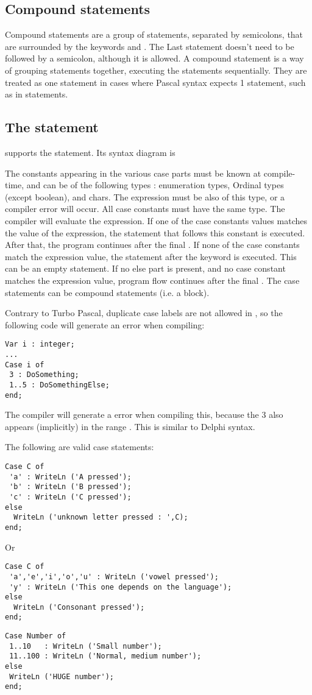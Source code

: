 \subsection{Compound statements}
Compound statements are a group of statements, separated by semicolons,
that are surrounded by the keywords  and . The
Last statement doesn't need to be followed by a semicolon, although it is
allowed. A compound statement is a way of grouping statements together,
executing the statements sequentially. They are treated as one statement
in cases where Pascal syntax expects 1 statement, such as in
 statements.

\subsection{The  statement}
\fpc supports the  statement. Its syntax diagram is

The constants appearing in the various case parts must be known at
compile-time, and can be of the following types : enumeration types,
Ordinal types (except boolean), and chars. The expression must be also of
this type, or a compiler error will occur. All case constants must
have the same type.
The compiler will evaluate the expression. If one of the case constants
values matches the value of the expression, the statement that follows
this constant is executed. After that, the program continues after the final
.
If none of the case constants match the expression value, the statement
after the  keyword is executed. This can be an empty statement.
If no else part is present, and no case constant matches the expression
value, program flow continues after the final .
The case statements can be compound statements
(i.e. a  block).

\begin{remark}
Contrary to Turbo Pascal, duplicate case labels are not
allowed in \fpc, so the following code will generate an error when
compiling:
\begin{verbatim}
Var i : integer;
...
Case i of
 3 : DoSomething;
 1..5 : DoSomethingElse;
end;
\end{verbatim}
The compiler will generate a  error when compiling
this, because the 3 also appears (implicitly) in the range . This
is similar to Delphi syntax.
\end{remark}
The following are valid case statements:
\begin{verbatim}
Case C of
 'a' : WriteLn ('A pressed');
 'b' : WriteLn ('B pressed');
 'c' : WriteLn ('C pressed');
else
  WriteLn ('unknown letter pressed : ',C);
end;
\end{verbatim}
Or
\begin{verbatim}
Case C of
 'a','e','i','o','u' : WriteLn ('vowel pressed');
 'y' : WriteLn ('This one depends on the language');
else
  WriteLn ('Consonant pressed');
end;
\end{verbatim}
\begin{verbatim}
Case Number of
 1..10   : WriteLn ('Small number');
 11..100 : WriteLn ('Normal, medium number');
else
 WriteLn ('HUGE number');
end;
\end{verbatim}
